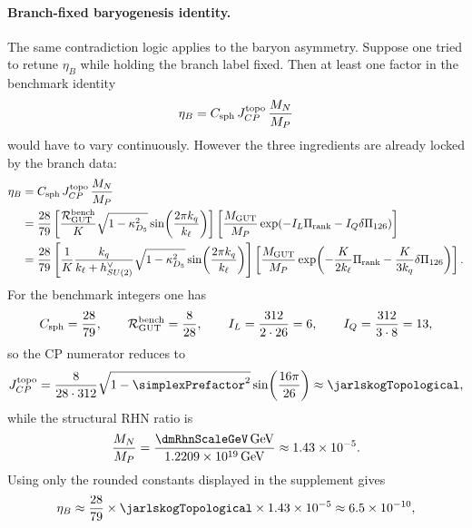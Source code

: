 \documentclass[11pt]{article}
\begin{document}
\paragraph{Branch-fixed baryogenesis identity.}
The same contradiction logic applies to the baryon asymmetry. Suppose one tried
to retune $\eta_B$ while holding the branch label fixed. Then at least one
factor in the benchmark identity
\begin{equation}
 \eta_B=C_{\rm sph}\,J_{CP}^{\rm topo}\,\frac{M_N}{M_P}
\end{equation}
would have to vary continuously. However the three ingredients are already
locked by the branch data:
\begin{align}
 \eta_B
 &=
 C_{\rm sph}\,J_{CP}^{\rm topo}\,\frac{M_N}{M_P}
 \notag\\
 &=
 \frac{28}{79}
 \left[
  \frac{\mathcal R_{\rm GUT}^{\rm bench}}{K}
  \sqrt{1-\kappa_{D_5}^2}
  \sin\!\left(\frac{2\pi k_q}{k_{\ell}}\right)
 \right]
 \left[
  \frac{M_{\rm GUT}}{M_P}
  \exp\!\left(-I_L\Pi_{\rm rank}-I_Q\delta\Pi_{126}\right)
 \right]
 \notag\\
 &=
 \frac{28}{79}
 \left[
  \frac{1}{K}\frac{k_q}{k_{\ell}+h_{SU(2)}^{\vee}}
  \sqrt{1-\kappa_{D_5}^2}
  \sin\!\left(\frac{2\pi k_q}{k_{\ell}}\right)
 \right]
 \left[
  \frac{M_{\rm GUT}}{M_P}
  \exp\!\left(
   -\frac{K}{2k_{\ell}}\Pi_{\rm rank}
   -\frac{K}{3k_q}\delta\Pi_{126}
  \right)
 \right].
 \label{eq:s6-etaB-branch-identity}
\end{align}
For the benchmark integers one has
\begin{equation}
 C_{\rm sph}=\frac{28}{79},
 \qquad
 \mathcal R_{\rm GUT}^{\rm bench}=\frac{8}{28},
 \qquad
 I_L=\frac{312}{2\cdot26}=6,
 \qquad
 I_Q=\frac{312}{3\cdot8}=13,
\end{equation}
so the CP numerator reduces to
\begin{equation}
 J_{CP}^{\rm topo}
 =
 \frac{8}{28\cdot312}
 \sqrt{1-\simplexPrefactor^2}
 \sin\!\left(\frac{16\pi}{26}\right)
 \approx \jarlskogTopological,
\end{equation}
while the structural RHN ratio is
\begin{equation}
 \frac{M_N}{M_P}
 =
 \frac{\dmRhnScaleGeV\,\mathrm{GeV}}{1.2209\times10^{19}\,\mathrm{GeV}}
 \approx 1.43\times10^{-5}.
\end{equation}
Using only the rounded constants displayed in the supplement gives
\begin{equation}
 \eta_B
 \approx
 \frac{28}{79}\times\jarlskogTopological\times1.43\times10^{-5}
 \approx
 6.5\times10^{-10},
\end{equation}
\end{document}
